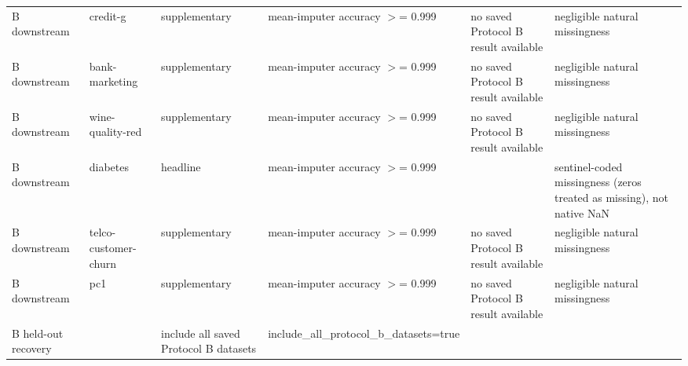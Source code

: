 \begin{table}[ht]
\begin{tabular}{llllll}
 B downstream        & credit-g             & supplementary                         & mean-imputer accuracy \ensuremath{>}= 0.999                                   & no saved Protocol B result available     & negligible natural missingness                                        \\
 B downstream        & bank-marketing       & supplementary                         & mean-imputer accuracy \ensuremath{>}= 0.999                                   & no saved Protocol B result available     & negligible natural missingness                                        \\
 B downstream        & wine-quality-red     & supplementary                         & mean-imputer accuracy \ensuremath{>}= 0.999                                   & no saved Protocol B result available     & negligible natural missingness                                        \\
 B downstream        & diabetes             & headline                              & mean-imputer accuracy \ensuremath{>}= 0.999                                   &                                          & sentinel-coded missingness (zeros treated as missing), not native NaN \\
 B downstream        & telco-customer-churn & supplementary                         & mean-imputer accuracy \ensuremath{>}= 0.999                                   & no saved Protocol B result available     & negligible natural missingness                                        \\
 B downstream        & pc1                  & supplementary                         & mean-imputer accuracy \ensuremath{>}= 0.999                                   & no saved Protocol B result available     & negligible natural missingness                                        \\
 B held-out recovery &                      & include all saved Protocol B datasets & include\_all\_protocol\_b\_datasets=true                             &                                          &                                                                       \\
\hline
\end{tabular}
\end{table}
